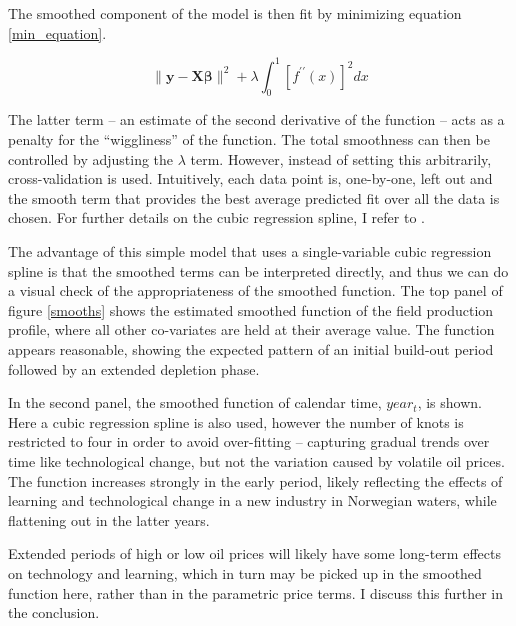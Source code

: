 \documentclass[12pt]{article}
\begin{document}
The smoothed component of the model is then fit by minimizing equation \ref{min_equation}.

\begin{equation}
\| \mathbf{y} - \mathbf{X\beta} \| ^2 + \lambda \int_{0}^{1} [f^{\prime \prime}(x)]^2 dx
\label{min_equation}
\end{equation}

The latter term -- an estimate of the second derivative of the function -- acts as a penalty for the ``wiggliness'' of the function. The total smoothness can then be controlled by adjusting the $\lambda$ term. However, instead of setting this arbitrarily, cross-validation is used. Intuitively, each data point is, one-by-one, left out and the smooth term that provides the best average predicted fit over all the data is chosen.  For further details on the cubic regression spline, I refer to \citet{wood_generalized_2006}.

The advantage of this simple model that uses a single-variable cubic regression spline is that the smoothed terms can be interpreted directly, and thus we can do a visual check of the appropriateness of the smoothed function. The top panel of figure \ref{smooths} shows the estimated smoothed function of the field production profile, where all other co-variates are held at their average value.  The function appears reasonable, showing the expected pattern of an initial build-out period followed by an extended depletion phase. 

In the second panel, the smoothed function of calendar time, $year_t$, is shown. Here a cubic regression spline is also used, however the number of knots is restricted to four in order to avoid over-fitting -- capturing gradual trends over time like technological change, but not the variation caused by volatile oil prices. The function increases strongly in the early period, likely reflecting the effects of learning and technological change in a new industry in Norwegian waters, while flattening out in the latter years. 

Extended periods of high or low oil prices will likely have some long-term effects on technology and learning, which in turn may be picked up in the smoothed function here, rather than in the parametric price terms.  I discuss this further in the conclusion.  
\end{document}
